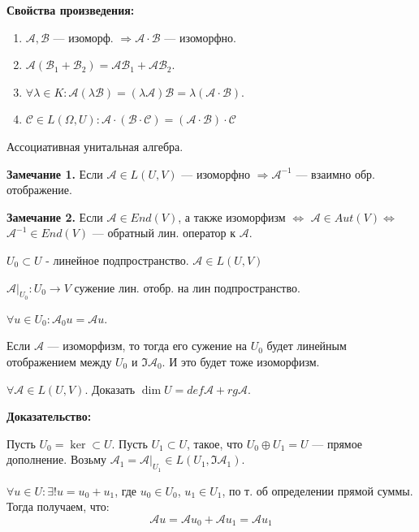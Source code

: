 \textbf{Свойства произведения:}
\begin{enumerate}
    \item $\mathcal{A}, \mathcal{B}$ --- изоморф. $\Rightarrow \mathcal{A} \cdot \mathcal{B}$ --- изоморфно.
    \item $\mathcal{A}(\mathcal{B}_1 + \mathcal{B}_2) =  \mathcal{A} \mathcal{B}_1 + \mathcal{A} \mathcal{B}_2$.
    \item  $\forall \lambda \in K: \mathcal{A}(\lambda \mathcal{B}) = (\lambda \mathcal{A}) \mathcal{B} = \lambda (\mathcal{A} \cdot \mathcal{B})$.
    \item $\mathcal{C} \in L(\Omega, U): \mathcal{A} \cdot (\mathcal{B}\cdot \mathcal{C}) = (\mathcal{A}\cdot \mathcal{B}) \cdot \mathcal{C}$
\end{enumerate}

Ассоциативная унитальная алгебра.

    \textbf{Замечание 1.} Если $\mathcal{A} \in L(U,V)$ --- изоморфно $\Rightarrow \mathcal{A}^{-1}$ --- взаимно обр. отображение.

\textbf{Замечание 2.} Если $\mathcal{A} \in End(V)$, а также изоморфизм $\Leftrightarrow$ $\mathcal{A} \in Aut(V) \Leftrightarrow$ $\mathcal{A}^{-1}\in End(V)$ --- обратный лин. оператор к $\mathcal{A}$.

 $U_0 \subset U$ - линейное подпространство. $\mathcal{A} \in L(U,V)$

$\mathcal{A}|_{U_0}: U_0 \rightarrow V$ сужение лин. отобр. на лин подпространство.

$\forall u \in U_0:\mathcal{A}_0 u = \mathcal{A}u$.

Если $\mathcal{A}$ --- изоморфизм, то тогда его сужение на $U_0$ будет линейным отображением между $U_0$ и $\Im \mathcal{A}_0$. И это будет тоже изоморфизм.



$\forall \mathcal{A} \in L(U, V)$. Доказать $\dim U = def \mathcal{A} + rg \mathcal{A}$.


\textbf{Доказательство:}


Пусть $ U_0 = \ker \subset U$.  Пусть $ U_1 \subset U$, такое, что $U_0 \oplus U_1 = U$ --- прямое дополнение. Возьму $\mathcal{A}_1 = \mathcal{A}|_{U_1} \in L(U_1, \Im \mathcal{A}_1)$.

$\forall u \in U: \exists! u = u_0 + u_1$, где $u_0 \in U_0$, $u_1 \in U_1$, по т. об определении прямой суммы. Тогда получаем, что:
$$\mathcal{A}u = \mathcal{A}u_0 +\mathcal{A}u_1 = \mathcal{A}u_1$$

